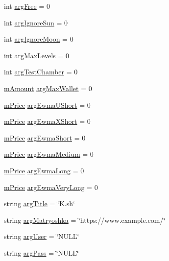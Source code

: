 \begin{DoxyCompactItemize}
int \hyperlink{class_k_1_1_c_f_a41db2c0e2e4ceca1dfff39f0ba30d72e}{arg\+Free} = 0
\item 
int \hyperlink{class_k_1_1_c_f_aa34daf182d57defef5e7f4557fff68e6}{arg\+Ignore\+Sun} = 0
\item 
int \hyperlink{class_k_1_1_c_f_a5aa7cca99b139409412af69133db10b1}{arg\+Ignore\+Moon} = 0
\item 
int \hyperlink{class_k_1_1_c_f_ab055f0fe04365bf08537040c5ba9d3ef}{arg\+Max\+Levels} = 0
\item 
int \hyperlink{class_k_1_1_c_f_a470f837189c8cb88935532c65444c298}{arg\+Test\+Chamber} = 0
\item 
\hyperlink{km_8h_ad4d00888c55a47a8a40ed8020d176086}{m\+Amount} \hyperlink{class_k_1_1_c_f_a6ba243e087d2134aa546907459589dbb}{arg\+Max\+Wallet} = 0
\item 
\hyperlink{km_8h_a392f9b7f384aa3539bbb890b059f5b8c}{m\+Price} \hyperlink{class_k_1_1_c_f_a62ca6f9cc06fae85d045ddb3b452b0d7}{arg\+Ewma\+U\+Short} = 0
\item 
\hyperlink{km_8h_a392f9b7f384aa3539bbb890b059f5b8c}{m\+Price} \hyperlink{class_k_1_1_c_f_a456df187a38686bcf173a862674b25ed}{arg\+Ewma\+X\+Short} = 0
\item 
\hyperlink{km_8h_a392f9b7f384aa3539bbb890b059f5b8c}{m\+Price} \hyperlink{class_k_1_1_c_f_aa863f101457aeab235daf34a708dd186}{arg\+Ewma\+Short} = 0
\item 
\hyperlink{km_8h_a392f9b7f384aa3539bbb890b059f5b8c}{m\+Price} \hyperlink{class_k_1_1_c_f_a33148205e367f7baa36de43f6c2b54d1}{arg\+Ewma\+Medium} = 0
\item 
\hyperlink{km_8h_a392f9b7f384aa3539bbb890b059f5b8c}{m\+Price} \hyperlink{class_k_1_1_c_f_a542c9f055f8a89a6fb9963d750be3417}{arg\+Ewma\+Long} = 0
\item 
\hyperlink{km_8h_a392f9b7f384aa3539bbb890b059f5b8c}{m\+Price} \hyperlink{class_k_1_1_c_f_a31294e3847b4d176d0b67dfc500fe268}{arg\+Ewma\+Very\+Long} = 0
\item 
string \hyperlink{class_k_1_1_c_f_ad88b2c38f30af5bfb88ddec1e06b6ead}{arg\+Title} = \char`\"{}K.\+sh\char`\"{}
\item 
string \hyperlink{class_k_1_1_c_f_a9e868129a03788dd992ba0e7548a6ea9}{arg\+Matryoshka} = \char`\"{}https\+://www.\+example.\+com/\char`\"{}
\item 
string \hyperlink{class_k_1_1_c_f_a892f38e1aca5d77e44a7b21f70710ebe}{arg\+User} = \char`\"{}N\+U\+LL\char`\"{}
\item 
string \hyperlink{class_k_1_1_c_f_a362e285d551ece07b51b724e25a7bc68}{arg\+Pass} = \char`\"{}N\+U\+LL\char`\"{}

\end{DoxyCompactItemize}
